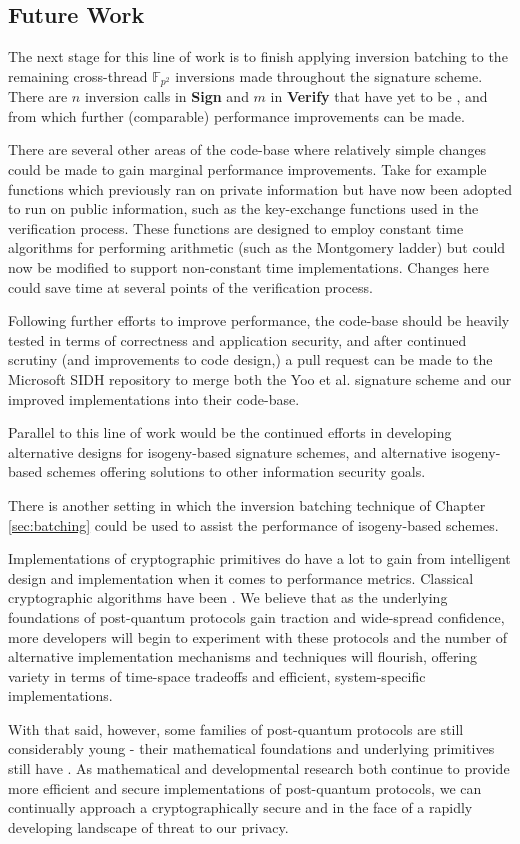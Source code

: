 \subsection{Future Work}
\label{sec:morebatch}

The next stage for this line of work is to finish applying inversion batching to the remaining cross-thread $\mathbb{F}_{p^2}$ inversions made throughout the signature scheme. There are $n$ inversion calls in \textbf{Sign} and $m$ in \textbf{Verify} that have yet to be , and from which further (comparable) performance improvements can be made.

There are several other areas of the code-base where relatively simple changes could be made to gain marginal performance improvements. Take for example functions which previously ran on private information but have now been adopted to run on public information, such as the key-exchange functions used in the verification process. These functions are designed to employ constant time algorithms for performing arithmetic (such as the Montgomery ladder) but could now be modified to support non-constant time implementations. Changes here could save time at several points of the verification process.

Following further efforts to improve performance, the code-base should be heavily tested in terms of correctness and application security, and after continued scrutiny (and improvements to code design,) a pull request can be made to the Microsoft SIDH repository \cite{sidhcode} to merge both the Yoo et al. signature scheme and our improved implementations into their code-base. 

Parallel to this line of work would be the continued efforts in developing alternative designs for isogeny-based signature schemes, and alternative isogeny-based schemes offering solutions to other information security goals.


There is another setting in which the inversion batching technique of Chapter \ref{sec:batching} could be used to assist the performance of isogeny-based schemes.

\vspace{50px}

Implementations of cryptographic primitives do have a lot to gain from intelligent design and implementation when it comes to performance metrics. Classical cryptographic algorithms have been . We believe that as the underlying foundations of post-quantum protocols gain traction and wide-spread confidence, more developers will begin to experiment with these protocols and the number of alternative implementation mechanisms and techniques will flourish, offering variety in terms of time-space tradeoffs and efficient, system-specific implementations. 

With that said, however, some families of post-quantum protocols are still considerably young - their mathematical foundations and underlying primitives still have . As mathematical and developmental research both continue to provide more efficient and secure implementations of post-quantum protocols, we can continually approach a cryptographically secure and in the face of a rapidly developing landscape of threat to our privacy. 
